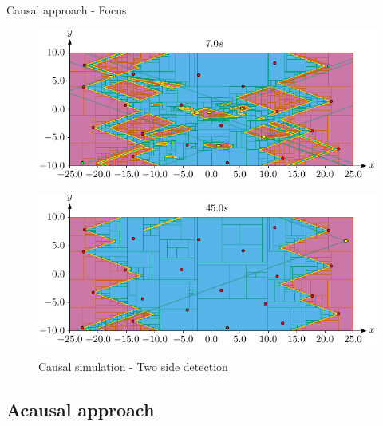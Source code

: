 \documentclass{beamer}
\begin{document}
            \begin{frame}{Causal approach - Focus}
                \begin{figure}
                    \centering
                    \vspace{0.2cm}
                    \begin{overprint}
                        \href{run:focus_1.mp4?loop}{\includegraphics[width=\textwidth]{imgs/focus_1}}
                            \caption{Causal simulation - Outliers}

                        \href{run:focus_2.mp4?loop}{\includegraphics[width=\textwidth]{imgs/focus_2}}
                            \caption{Causal simulation - Two side detection}
                    \end{overprint}
                \end{figure}
            \end{frame}

        \subsection{Acausal approach}
\end{document}
